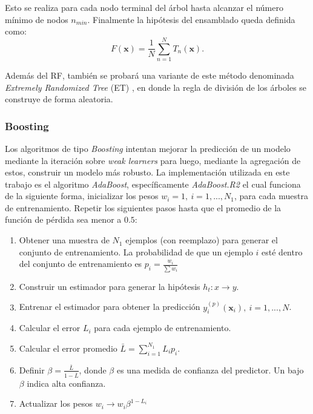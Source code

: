 \documentclass[spanish]{article}
\begin{document}
          Esto se realiza para cada nodo terminal del árbol hasta alcanzar el número mínimo de nodos 
          $n_{min}$. Finalmente la hipótesis del ensamblado queda definida como:          
          \begin{equation}
            F(\textbf{x}) = \frac1N \sum_{n=1}^N T_n(\textbf{x}).
          \end{equation}
          
          Además del RF, también se probará una variante de este método denominada 
          \emph{Extremely Randomized Tree} (ET) \cite{geurts2006extremely}, en donde la regla de división de los árboles se 
          construye de forma aleatoria.%

                        
        \subsubsection{Boosting}
            
          Los algoritmos de tipo \emph{Boosting} \cite{freund1997decision} intentan mejorar la predicción de un modelo mediante 
          la iteración sobre \emph{weak learners} para luego, mediante la agregación de estos, construir 
          un modelo más robusto. La implementación utilizada en este trabajo es el algoritmo \emph{AdaBoost}, 
          específicamente \emph{AdaBoost.R2} \cite{drucker1997improving} el cual funciona de la siguiente 
          forma, inicializar los pesos $w_i=1, ~ i=1,...,N_1$, para cada muestra de entrenamiento. 
          Repetir los siguientes pasos hasta que el promedio de la función de pérdida sea menor a $0.5$:
          \begin{enumerate}
            \item Obtener una muestra de $N_1$ ejemplos (con reemplazo) para generar el conjunto de 
              entrenamiento. La probabilidad de que un ejemplo $i$ esté dentro del conjunto de entrenamiento 
              es $p_i=\frac{w_i}{\sum w_i}$
            \item Construir un estimador para generar la hipótesis $h_t: x \rightarrow y$.
            \item Entrenar el estimador para obtener la predicción $y_i^{(p)}(\textbf{x}_i), ~ i=1, ..., N$.
            \item Calcular el error $L_i$ para cada ejemplo de entrenamiento.
            \item Calcular el error promedio $\bar{L}=\sum_{i=1}^{N_1}L_ip_i$.
            \item Definir $\beta=\frac{\bar{L}}{1-\bar{L}}$, donde $\beta$ es una medida de confianza del 
              predictor. Un bajo $\beta$ indica alta confianza.
            \item Actualizar los pesos $w_i\rightarrow w_i\beta^{1-L_i}$
          \end{enumerate}
            
\end{document}
